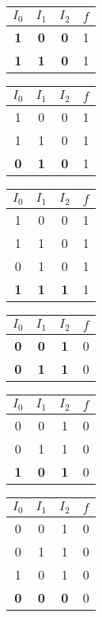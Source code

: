 \documentclass{article}
\begin{document}
\begin{center}
\small
\begin{tabular}{ccc|c}
$I_0$ & $I_1$ & $I_2$ & $f$ \\\hline
         \textbf{1} &  \textbf{0} &  \textbf{0} & 1 \\
 \textbf{1} &  \textbf{1} &  \textbf{0} & 1 \\
\end{tabular}
\quad\quad
\begin{tabular}{ccc|c}
$I_0$ & $I_1$ & $I_2$ & $f$ \\\hline
        1 & 0 & 0 & 1 \\
1 & 1 & 0 & 1 \\
 \textbf{0} &  \textbf{1} &  \textbf{0} & 1 \\
\end{tabular}
\quad\quad
\begin{tabular}{ccc|c}
$I_0$ & $I_1$ & $I_2$ & $f$ \\\hline
        1 & 0 & 0 & 1 \\
1 & 1 & 0 & 1 \\
0 & 1 & 0 & 1 \\
 \textbf{1} &  \textbf{1} &  \textbf{1} & 1 \\
\end{tabular}
\quad\quad
\end{center}

\begin{center}
\small

\begin{tabular}{ccc | c}
$I_0$ & $I_1$ & $I_2$ & $f$ \\\hline
         \textbf{0} &  \textbf{0} &  \textbf{1} & 0 \\
 \textbf{0} &  \textbf{1} &  \textbf{1} & 0 \\
\end{tabular}
\quad\quad
\begin{tabular}{ccc | c}
$I_0$ & $I_1$ & $I_2$ & $f$ \\\hline
        0 & 0 & 1 & 0 \\
0 & 1 & 1 & 0 \\
 \textbf{1} &  \textbf{0} &  \textbf{1} & 0 \\
\end{tabular}
\quad\quad
\begin{tabular}{ccc | c}
$I_0$ & $I_1$ & $I_2$ & $f$ \\\hline
        0 & 0 & 1 & 0 \\
0 & 1 & 1 & 0 \\
1 & 0 & 1 & 0 \\
 \textbf{0} &  \textbf{0} &  \textbf{0} & 0 \\
\end{tabular}
\quad\quad
\end{center}
\end{document}
